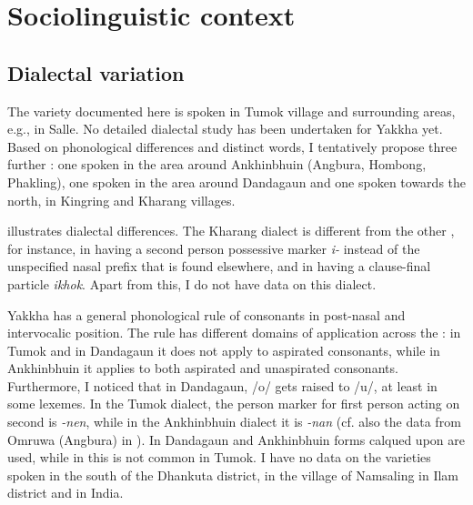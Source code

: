 \section{Sociolinguistic context}\label{socioling}
\subsection{Dialectal variation}\label{sc-dialect}

The variety documented here is spoken in Tumok village and surrounding areas, e.g., in Salle. No detailed dialectal study has been undertaken for Yakkha yet. Based on phonological differences and distinct  words, I tentatively propose three further : one spoken in the area around Ankhinbhuin (Angbura, Hombong, Phakling), one spoken in the area around Dandagaun and one spoken towards the north, in Kingring and Kharang villages. 

 illustrates dialectal differences. The Kharang dialect is different from the other , for instance, in having a second person possessive marker \emph{i-} instead of the unspecified nasal prefix that is found elsewhere,  and in having a clause-final  particle \emph{ikhok}. Apart from this, I do not have data on this dialect. 

Yakkha has a general phonological rule of  consonants in post-nasal and intervocalic position. The rule has different domains of application across the : in Tumok and in Dandagaun it does not apply to aspirated consonants, while in Ankhinbhuin it applies to both aspirated and unaspirated consonants. Furthermore, I noticed that in Dandagaun,  /o/ gets raised to /u/, at least in some lexemes. In the Tumok  dialect, the person marker for first person acting on second is \emph{-nen}, while in the Ankhinbhuin dialect it is \emph{-nan} (cf. also the data from Omruwa (Angbura) in \citealt{Driem1994The-Yakkha}). In Dandagaun and Ankhinbhuin   forms calqued upon  are used, while in  this is not common in Tumok. I have no data on the varieties spoken in the south of the Dhankuta district, in the village of Namsaling in Ilam district and in India.


